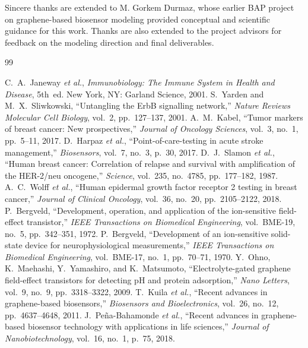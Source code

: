 \documentclass[12pt,a4paper,oneside]{report}
\begin{document}
Sincere thanks are extended to M. Gorkem Durmaz, whose earlier BAP project on graphene-based biosensor modeling provided conceptual and scientific guidance for this work. Thanks are also extended to the project advisors for feedback on the modeling direction and final deliverables.

\begin{thebibliography}{99}

 C.~A.~Janeway \textit{et al.}, \textit{Immunobiology: The Immune System in Health and Disease}, 5th~ed. New York, NY: Garland Science, 2001.
 S.~Yarden and M.~X.~Sliwkowski, ``Untangling the ErbB signalling network,'' \textit{Nature Reviews Molecular Cell Biology}, vol.~2, pp.~127--137, 2001.
 A.~M.~Kabel, ``Tumor markers of breast cancer: New prospectives,'' \textit{Journal of Oncology Sciences}, vol.~3, no.~1, pp.~5--11, 2017.
 D.~Harpaz \textit{et al.}, ``Point-of-care-testing in acute stroke management,'' \textit{Biosensors}, vol.~7, no.~3, p.~30, 2017.
 D.~J.~Slamon \textit{et al.}, ``Human breast cancer: Correlation of relapse and survival with amplification of the HER-2/neu oncogene,'' \textit{Science}, vol.~235, no.~4785, pp.~177--182, 1987.
 A.~C.~Wolff \textit{et al.}, ``Human epidermal growth factor receptor 2 testing in breast cancer,'' \textit{Journal of Clinical Oncology}, vol.~36, no.~20, pp.~2105--2122, 2018.
 P.~Bergveld, ``Development, operation, and application of the ion-sensitive field-effect transistor,'' \textit{IEEE Transactions on Biomedical Engineering}, vol.~BME-19, no.~5, pp.~342--351, 1972.
 P.~Bergveld, ``Development of an ion-sensitive solid-state device for neurophysiological measurements,'' \textit{IEEE Transactions on Biomedical Engineering}, vol.~BME-17, no.~1, pp.~70--71, 1970.
 Y.~Ohno, K.~Maehashi, Y.~Yamashiro, and K.~Matsumoto, ``Electrolyte-gated graphene field-effect transistors for detecting pH and protein adsorption,'' \textit{Nano Letters}, vol.~9, no.~9, pp.~3318--3322, 2009.
 T.~Kuila \textit{et al.}, ``Recent advances in graphene-based biosensors,'' \textit{Biosensors and Bioelectronics}, vol.~26, no.~12, pp.~4637--4648, 2011.
 J.~Pe\~na-Bahamonde \textit{et al.}, ``Recent advances in graphene-based biosensor technology with applications in life sciences,'' \textit{Journal of Nanobiotechnology}, vol.~16, no.~1, p.~75, 2018.

\end{thebibliography}
\end{document}
